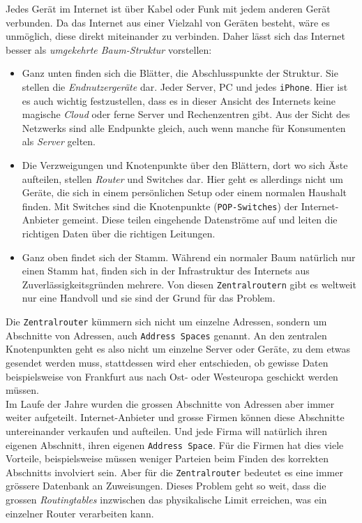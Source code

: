 \documentclass[11pt]{article}
\begin{document}
\noindent Jedes Gerät im Internet ist über Kabel oder Funk mit jedem
anderen Gerät verbunden. Da das Internet aus einer Vielzahl von
Geräten besteht, wäre es unmöglich, diese direkt miteinander zu
verbinden. Daher lässt sich das Internet besser als \emph{umgekehrte
Baum-Struktur} vorstellen:
\begin{itemize}
\item Ganz unten finden sich die Blätter, die Abschlusspunkte der
Struktur. Sie stellen die \emph{Endnutzergeräte} dar. Jeder Server, PC und
jedes \texttt{iPhone}. Hier ist es auch wichtig festzustellen, dass es in
dieser Ansicht des Internets keine magische \emph{Cloud} oder ferne Server
und Rechenzentren gibt. Aus der Sicht des Netzwerks sind alle
Endpunkte gleich, auch wenn manche für Konsumenten als \emph{Server}
gelten.
\item Die Verzweigungen und Knotenpunkte über den Blättern, dort wo sich
Äste aufteilen, stellen \emph{Router} und Switches dar. Hier geht es
allerdings nicht um Geräte, die sich in einem persönlichen Setup
oder einem normalen Haushalt finden. Mit Switches sind die
Knotenpunkte (\texttt{POP-Switches}) der Internet-Anbieter gemeint. Diese
teilen eingehende Datenströme auf und leiten die richtigen Daten
über die richtigen Leitungen.
\item Ganz oben findet sich der Stamm. Während ein normaler Baum natürlich
nur einen Stamm hat, finden sich in der Infrastruktur des Internets
aus Zuverlässigkeitsgründen mehrere. Von diesen \texttt{Zentralroutern} gibt
es weltweit nur eine Handvoll und sie sind der Grund für das
Problem.
\end{itemize}

\noindent Die \texttt{Zentralrouter} kümmern sich nicht um einzelne Adressen,
sondern um Abschnitte von Adressen, auch \texttt{Address Spaces} genannt. An
den zentralen Knotenpunkten geht es also nicht um einzelne Server oder
Geräte, zu dem etwas gesendet werden muss, stattdessen wird eher
entschieden, ob gewisse Daten beispielsweise von Frankfurt aus nach
Ost- oder Westeuropa geschickt werden müssen.\\

\noindent Im Laufe der Jahre wurden die grossen Abschnitte von
Adressen aber immer weiter aufgeteilt. Internet-Anbieter und grosse
Firmen können diese Abschnitte untereinander verkaufen und aufteilen.
Und jede Firma will natürlich ihren eigenen Abschnitt, ihren eigenen
\texttt{Address Space}. Für die Firmen hat dies viele Vorteile, beispielsweise
müssen weniger Parteien beim Finden des korrekten Abschnitts
involviert sein. Aber für die \texttt{Zentralrouter} bedeutet es eine immer
grössere Datenbank an Zuweisungen. Dieses Problem geht so weit, dass
die grossen \emph{Routingtables} inzwischen das physikalische Limit
erreichen, was ein einzelner Router verarbeiten kann.\\
\end{document}
